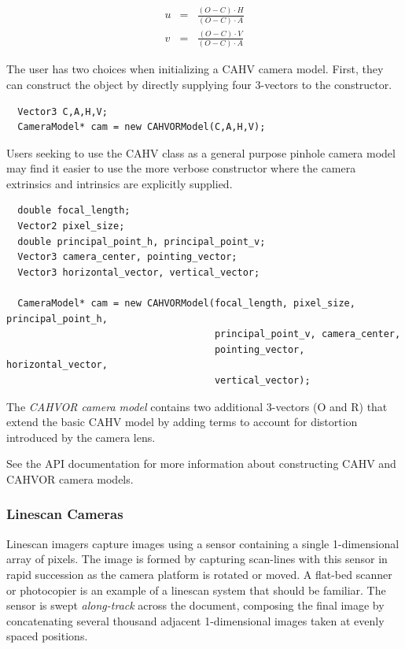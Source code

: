 \begin{eqnarray}
u & = & \frac{(O-C) \cdot H}{(O-C) \cdot A}\\
v & = & \frac{(O-C) \cdot V}{(O-C) \cdot A}
\end{eqnarray}

The user has two choices when initializing a CAHV camera model.
First, they can construct the object by directly supplying four
3-vectors to the constructor.

\begin{verbatim}
  Vector3 C,A,H,V;
  CameraModel* cam = new CAHVORModel(C,A,H,V);
\end{verbatim}

Users seeking to use the CAHV class as a general purpose pinhole
camera model may find it easier to use the more verbose constructor
where the camera extrinsics and intrinsics are explicitly supplied.

\begin{verbatim}
  double focal_length;
  Vector2 pixel_size;
  double principal_point_h, principal_point_v;
  Vector3 camera_center, pointing_vector;
  Vector3 horizontal_vector, vertical_vector;

  CameraModel* cam = new CAHVORModel(focal_length, pixel_size, principal_point_h, 
                                     principal_point_v, camera_center, 
                                     pointing_vector, horizontal_vector,
                                     vertical_vector);  
\end{verbatim}


The {\em CAHVOR camera model} contains two additional 3-vectors (O and R)
that extend the basic CAHV model by adding terms to account for
distortion introduced by the camera lens.

See the API documentation for more information about constructing CAHV
and CAHVOR camera models.

\subsubsection{Linescan Cameras}

Linescan imagers capture images using a sensor containing a single
1-dimensional array of pixels.  The image is formed by capturing
scan-lines with this sensor in rapid succession as the camera platform
is rotated or moved.  A flat-bed scanner or photocopier is an example
of a linescan system that should be familiar.  The sensor is swept
{\em along-track} across the document, composing the final image by
concatenating several thousand adjacent 1-dimensional images taken at
evenly spaced positions.

